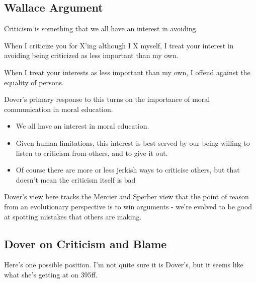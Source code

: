 \documentclass[
]{article}
\providecommand{\tightlist}{%
  \setlength{\itemsep}{0pt}\setlength{\parskip}{0pt}}
\begin{document}
\hypertarget{wallace-argument}{%
\subsection{Wallace Argument}\label{wallace-argument}}

\begin{description}
\tightlist
\item[INTEREST]
Criticism is something that we all have an interest in avoiding.
\item[TREATMENT]
When I criticize you for X'ing although I X myself, I treat your
interest in avoiding being criticized as less important than my own.
\item[EQUALITY]
When I treat your interests as less important than my own, I offend
against the equality of persons.
\end{description}

Dover's primary response to this turns on the importance of moral
communication in moral education.

\begin{itemize}
\tightlist
\item
  We all have an interest in moral education.
\item
  Given human limitations, this interest is best served by our being
  willing to listen to criticism from others, and to give it out.
\item
  Of course there are more or less jerkish ways to criticise others, but
  that doesn't mean the criticism itself is bad
\end{itemize}

Dover's view here tracks the Mercier and Sperber view that the point of
reason from an evolutionary perspective is to win arguments - we're
evolved to be good at spotting mistakes that others are making.

\hypertarget{dover-on-criticism-and-blame}{%
\subsection{Dover on Criticism and
Blame}\label{dover-on-criticism-and-blame}}

Here's one possible position. I'm not quite sure it is Dover's, but it
seems like what she's getting at on 395ff.
\end{document}
